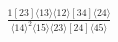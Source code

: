\documentclass[varwidth, border=5pt]{standalone}
\begin{document}
\begin{my}
$\begin{gathered}
\scriptscriptstyle\frac{1[23]⟨13⟩⟨12⟩[34]⟨24⟩}{⟨14⟩^2⟨15⟩⟨23⟩[24]⟨45⟩}
\end{gathered}$
\end{my}
\end{document}
